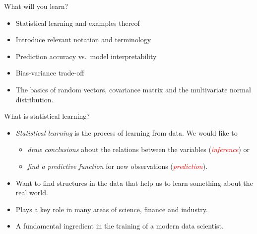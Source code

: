 \documentclass[ignorenonframetext,]{beamer}
\providecommand{\tightlist}{%
  \setlength{\itemsep}{0pt}\setlength{\parskip}{0pt}}
\begin{document}
\begin{frame}

\begin{block}{What will you learn?}

\vspace{2mm}

\begin{itemize}
\item
  Statistical learning and examples thereof \vspace{1mm}
\item
  Introduce relevant notation and terminology \vspace{1mm}
\item
  Prediction accuracy vs.~model interpretability \vspace{1mm}
\item
  Bias-variance trade-off \vspace{1mm}
\item
  The basics of random vectors, covariance matrix and the multivariate
  normal distribution.
\end{itemize}

\end{block}

\end{frame}

\begin{frame}{What is statistical learning?}
\protect\hypertarget{what-is-statistical-learning}{}

\begin{itemize}
\item
  \emph{Statistical learning} is the process of learning from data. We
  would like to

  \begin{itemize}
  \tightlist
  \item
    \emph{draw conclusions} about the relations between the variables
    (\emph{\textcolor{red}{inference}}) or
  \item
    \emph{find a predictive function} for new observations
    (\emph{\textcolor{red}{prediction}}).
  \end{itemize}
\item
  Want to find structures in the data that help us to learn something
  about the real world.
\item
  Plays a key role in many areas of science, finance and industry.
\item
  A fundamental ingredient in the training of a modern data scientist.
\end{itemize}

\end{frame}
\end{document}
